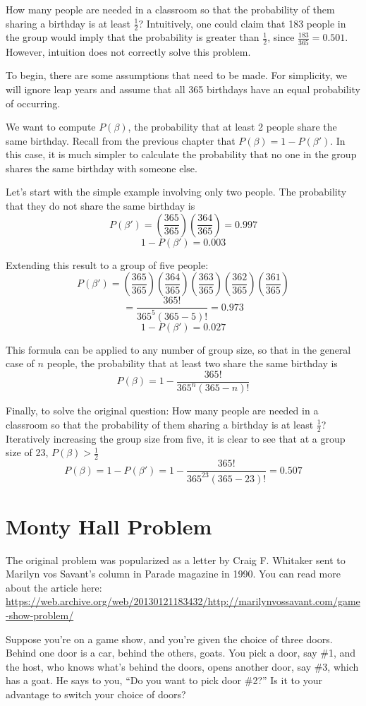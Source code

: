 \documentclass[
]{book}
\begin{document}
How many people are needed in a classroom so that the probability of them sharing a birthday is at least \(\frac{1}{2}\)?
Intuitively, one could claim that 183 people in the group would imply that the probability is greater than \(\frac{1}{2}\),
since \(\frac{183}{365} = 0.501\). However, intuition does not correctly solve this problem.

To begin, there are some assumptions that need to be made.
For simplicity, we will ignore leap years and assume that all 365 birthdays have an equal probability of occurring.

We want to compute \(P(\beta)\), the probability that at least 2 people share the same birthday.
Recall from the previous chapter that \(P(\beta) = 1 - P(\beta')\).
In this case, it is much simpler to calculate the probability that no one in the group shares the same birthday with someone else.

Let's start with the simple example involving only two people. The probability that they do not share the same birthday is
\[P(\beta') = \left( \frac{365}{365} \right) \left( \frac{364}{365} \right) = 0.997\]
\[1 - P(\beta') = 0.003\]

Extending this result to a group of five people:
\[P(\beta') = \left( \frac{365}{365} \right) \left( \frac{364}{365} \right) \left( \frac{363}{365} \right) 
\left( \frac{362}{365} \right) \left( \frac{361}{365} \right)\]
\[ = \frac{365!}{365^5(365 - 5)!} = 0.973\]
\[1 - P(\beta') = 0.027\]

This formula can be applied to any number of group size, so that in the general case of \(n\) people,
the probability that at least two share the same birthday is
\[P(\beta) = 1 - \frac{365!}{365^n(365 - n)!}\]

Finally, to solve the original question:
How many people are needed in a classroom so that the probability of them sharing a birthday is at least \(\frac{1}{2}\)?
Iteratively increasing the group size from five, it is clear to see that at a group size of 23, \(P(\beta) > \frac{1}{2}\)
\[P(\beta) = 1 - P(\beta') = 1 - \frac{365!}{365^{23}(365 - 23)!} = 0.507\]

\hypertarget{monty-hall-problem}{%
\section{Monty Hall Problem}\label{monty-hall-problem}}

The original problem was popularized as a letter by Craig F. Whitaker sent to Marilyn vos Savant's column in Parade magazine in 1990.
You can read more about the article here: \url{https://web.archive.org/web/20130121183432/http://marilynvossavant.com/game-show-problem/}

Suppose you're on a game show, and you're given the choice of three doors. Behind one door is a car, behind the others, goats.
You pick a door, say \#1, and the host, who knows what's behind the doors, opens another door, say \#3, which has a goat.
He says to you, ``Do you want to pick door \#2?'' Is it to your advantage to switch your choice of doors?

  
\end{document}
